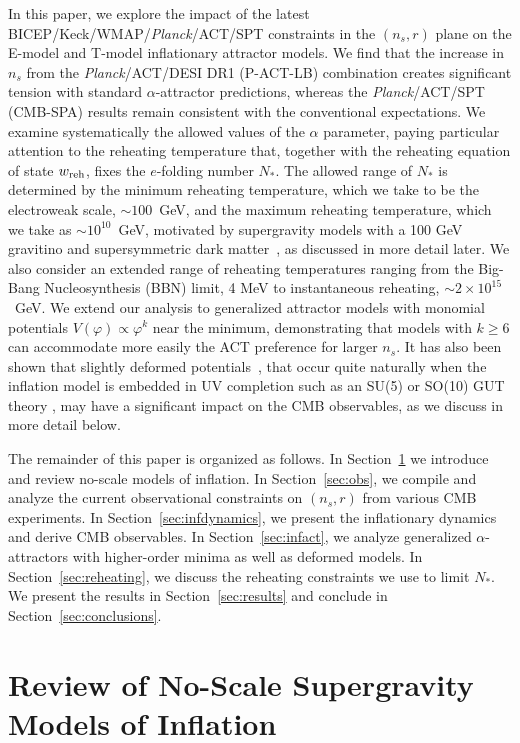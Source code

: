\documentclass[aps,prev,twocolumn,preprintnumbers,floatfix,nofootinbib]{revtex4-1}
\begin{document}
In this paper, we explore the impact of the latest BICEP/Keck/WMAP/\textit{Planck}/ACT/SPT constraints in the $(n_s, r)$ plane on the E-model and T-model inflationary attractor models. We find that the increase in $n_s$ from the {\it Planck}/ACT/DESI DR1 (P-ACT-LB) combination creates significant tension with standard $\alpha$-attractor predictions, whereas the {\it Planck}/ACT/SPT (CMB-SPA) results remain consistent with the conventional expectations.
We examine systematically the allowed values of the $\alpha$ parameter, 
paying particular attention to the reheating temperature that, together with the reheating equation of state $w_{\rm reh}$, fixes the $e$-folding number $N_*$. The allowed range of $N_*$ is determined by the minimum reheating temperature, which we take to be the electroweak scale, $\sim 100$~GeV, and the maximum reheating temperature, which we take as $\sim 10^{10}$~GeV, motivated by supergravity models with a 100 GeV gravitino and supersymmetric dark matter~\cite{ego,ENOV4}, as discussed in more detail later. We also consider an extended range of reheating temperatures ranging from the Big-Bang Nucleosynthesis (BBN) limit, 4 MeV \cite{tr4} to instantaneous reheating, $\sim 2 \times 10^{15}$~GeV. We extend our analysis to generalized attractor models with monomial potentials $V(\varphi) \propto \varphi^k$ near the minimum, demonstrating that models with $k \geq 6$ can accommodate more easily the ACT preference for larger $n_s$. It has also been shown that slightly deformed potentials~\cite{accid}, that occur quite naturally when the inflation model is embedded in UV completion such as an SU(5) or SO(10) GUT theory \cite{deform}, may have a significant impact on the CMB observables, as we discuss in more detail below.

The remainder of this paper is organized as follows. In Section~\ref{sec:no-scale} we introduce and review no-scale models of inflation. In Section~\ref{sec:obs}, we compile and analyze the current observational constraints on $(n_s, r)$ from various CMB experiments. In Section~\ref{sec:infdynamics}, we present the inflationary dynamics and derive CMB observables. In Section~\ref{sec:infact}, we analyze generalized $\alpha$-attractors with higher-order minima as well as deformed models. In Section~\ref{sec:reheating}, we discuss the reheating constraints we use to limit $N_*$. We present the results in Section~\ref{sec:results} and conclude in Section~\ref{sec:conclusions}.

\section{Review of No-Scale Supergravity Models of Inflation}
\label{sec:no-scale}
\end{document}
